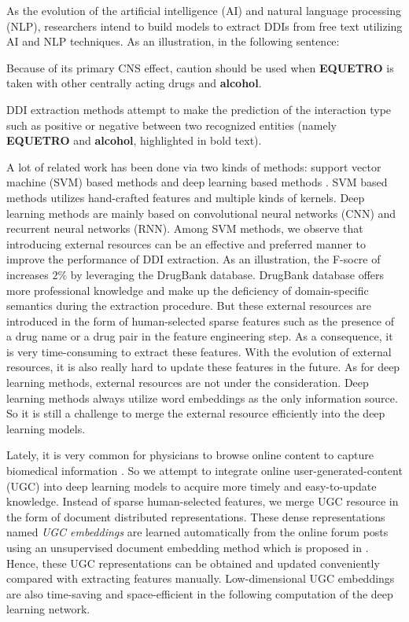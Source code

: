 \documentclass[conference]{IEEEtran}
\begin{document}
As the evolution of the artificial intelligence (AI) and natural language processing (NLP),
researchers intend to build models to extract DDIs from free text utilizing AI and NLP techniques.
As an illustration, in the following sentence:

\begin{framed}
Because of its primary CNS effect, caution should be used when \textbf{EQUETRO}
is taken with other centrally acting drugs and \textbf{alcohol}.
\end{framed}

\noindent DDI extraction methods attempt to make the prediction of the interaction type such as positive or negative between
two recognized entities (namely \textbf{EQUETRO} and \textbf{alcohol}, highlighted in bold text).

A lot of related work has been done via two kinds of methods:
support vector machine (SVM) based methods
\cite{chowdhury_fbk-irst:_2013, thomas_wbi-ddi:_2013, bjorne_uturku:_2013, rastegar-mojarad_uwm-triads:_2013, kim_extracting_2015}
and deep learning based methods \cite{zhao_drug_2016, sahu_drug-drug_2017}.
SVM based methods utilizes hand-crafted features and multiple kinds of kernels.
Deep learning methods are mainly based on convolutional neural networks (CNN) and recurrent neural networks (RNN).
Among SVM methods, we observe that introducing external resources can be an effective and preferred manner to improve the performance of DDI extraction.
As an illustration, the F-socre of \cite{bjorne_uturku:_2013} increases $2\%$ by leveraging the DrugBank database.
DrugBank database offers more professional knowledge and make up the deficiency of domain-specific semantics during the extraction procedure.
But these external resources are introduced in the form of human-selected sparse features
such as the presence of a drug name or a drug pair in the feature engineering step.
As a consequence, it is very time-consuming to extract these features.
With the evolution of external resources, it is also really hard to update these features in the future.
As for deep learning methods, external resources are not under the consideration.
Deep learning methods always utilize word embeddings as the only information source.
So it is still a challenge to merge the external resource efficiently into the deep learning models.

Lately, it is very common for physicians to browse online content to capture biomedical information 
\cite{de_leo_websites_2006}.
So we attempt to integrate online user-generated-content (UGC) into deep learning models to acquire more timely and easy-to-update knowledge.
Instead of sparse human-selected features, we merge UGC resource in the form of document distributed representations.
These dense representations named \emph{UGC embeddings} are learned automatically from the online forum posts
using an unsupervised document embedding method which is proposed in \cite{le_distributed_2014}.
Hence, these UGC representations can be obtained and updated conveniently compared with extracting features manually.
Low-dimensional UGC embeddings are also time-saving and space-efficient in the following computation of the deep learning network.
\end{document}
